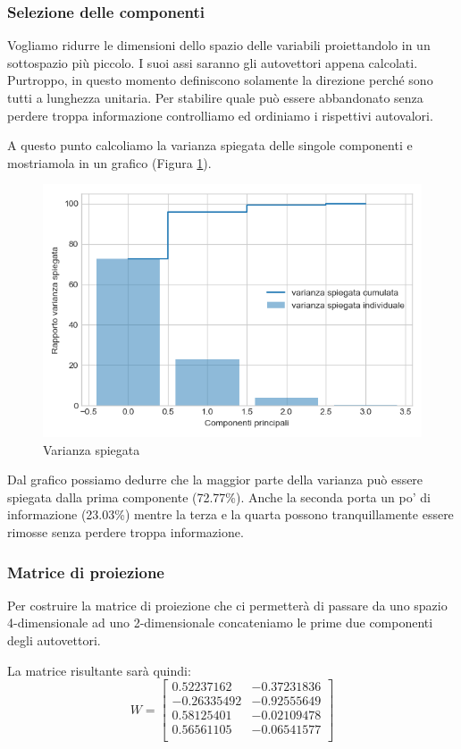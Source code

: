 \documentclass[12pt]{article}
\newcommand{\codice}[2]{}
\begin{document}
		\subsubsection{Selezione delle componenti}		
			Vogliamo ridurre le dimensioni dello spazio delle variabili proiettandolo in un sottospazio più piccolo. I suoi assi saranno gli autovettori appena calcolati. Purtroppo, in questo momento definiscono solamente la direzione perché sono tutti a lunghezza unitaria.	Per stabilire quale può essere abbandonato senza perdere troppa informazione controlliamo ed ordiniamo i rispettivi autovalori.
			\codice{96}{105}
			A questo punto calcoliamo la varianza spiegata delle singole componenti e mostriamola in un grafico (Figura \ref{fig:varSpieg}).
			\codice{108}{123}
			\begin{figure}
				\begin{center}
					\includegraphics[scale=.5]{istoVarianza}
					\caption{Varianza spiegata}
					\label{fig:varSpieg}
				\end{center}
			\end{figure}
			Dal grafico possiamo dedurre che la maggior parte della varianza può essere spiegata dalla prima componente (72.77\%). Anche la seconda porta un po' di informazione (23.03\%) mentre la terza e la quarta possono tranquillamente essere rimosse senza perdere troppa informazione.
			
		\subsubsection{Matrice di proiezione}
			Per costruire la matrice di proiezione che ci permetterà di passare da uno spazio 4-dimensionale ad uno 2-dimensionale concateniamo le prime due componenti degli autovettori.
			\codice{125}{127}
			La matrice risultante sarà quindi:
			$$W = \begin{bmatrix}
				0.52237162 & -0.37231836\\
				-0.26335492 & -0.92555649\\
				0.58125401 & -0.02109478\\
				0.56561105 & -0.06541577\\
			\end{bmatrix}$$
			
\end{document}

